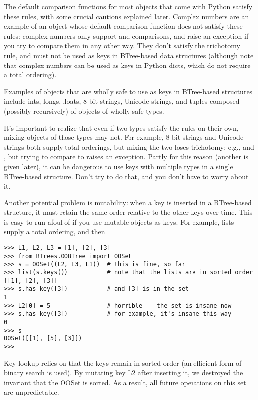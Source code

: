 The default comparison functions for most objects that come with Python
satisfy these rules, with some crucial cautions explained later.  Complex
numbers are an example of an object whose default comparison function
does not satisfy these rules:  complex numbers only support \code{==}
and \code{!=} comparisons, and raise an exception if you try to compare
them in any other way.  They don't satisfy the trichotomy rule, and must
not be used as keys in BTree-based data structures (although note that
complex numbers can be used as keys in Python dicts, which do not require
a total ordering).

Examples of objects that are wholly safe to use as keys in BTree-based
structures include ints, longs, floats, 8-bit strings, Unicode strings,
and tuples composed (possibly recursively) of objects of wholly safe
types.

It's important to realize that even if two types satisfy the
rules on their own, mixing objects of those types may not.  For example,
8-bit strings and Unicode strings both supply total orderings, but mixing
the two loses trichotomy; e.g.,  and
, but trying to compare  to
 raises an exception.  Partly for this reason (another is
given later), it can be dangerous to use keys with multiple types in
a single BTree-based structure.  Don't try to do that, and you don't
have to worry about it.

Another potential problem is mutability:  when a key is inserted in a
BTree-based structure, it must retain the same order relative to the
other keys over time.  This is easy to run afoul of if you use mutable
objects as keys.  For example, lists supply a total ordering, and then

\begin{verbatim}
>>> L1, L2, L3 = [1], [2], [3]
>>> from BTrees.OOBTree import OOSet
>>> s = OOSet((L2, L3, L1))  # this is fine, so far
>>> list(s.keys())           # note that the lists are in sorted order
[[1], [2], [3]]
>>> s.has_key([3])           # and [3] is in the set
1
>>> L2[0] = 5                # horrible -- the set is insane now
>>> s.has_key([3])           # for example, it's insane this way
0
>>> s
OOSet([[1], [5], [3]])
>>>
\end{verbatim}

Key lookup relies on that the keys remain in sorted order (an efficient
form of binary search is used).  By mutating key L2 after inserting it,
we destroyed the invariant that the OOSet is sorted.  As a result, all
future operations on this set are unpredictable.

